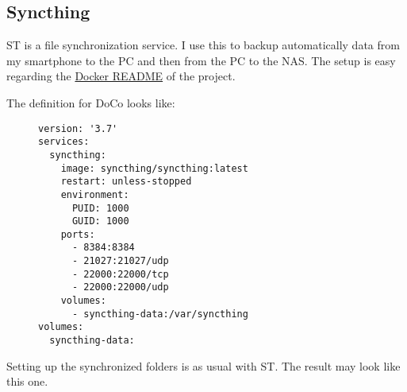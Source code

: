 

\subsection{Syncthing}

\gls{ST} is a file synchronization service. I use this to backup automatically
data from my smartphone to the PC and then from the PC to the NAS. The setup
is easy regarding the \href{https://github.com/syncthing/syncthing/blob/main/README-Docker.md}{Docker README}
of the project.
\bigbreak

The definition for \gls{DoCo} looks like:

\begin{figure}[H]
    \scriptsize
    \centering
    \begin{BVerbatim}
version: '3.7'
services:
  syncthing:
    image: syncthing/syncthing:latest
    restart: unless-stopped
    environment:
      PUID: 1000
      GUID: 1000
    ports:
      - 8384:8384
      - 21027:21027/udp
      - 22000:22000/tcp
      - 22000:22000/udp
    volumes:
      - syncthing-data:/var/syncthing
volumes:
  syncthing-data:
    \end{BVerbatim}
\end{figure}

Setting up the synchronized folders is as usual with \gls{ST}. The result
may look like this one.

